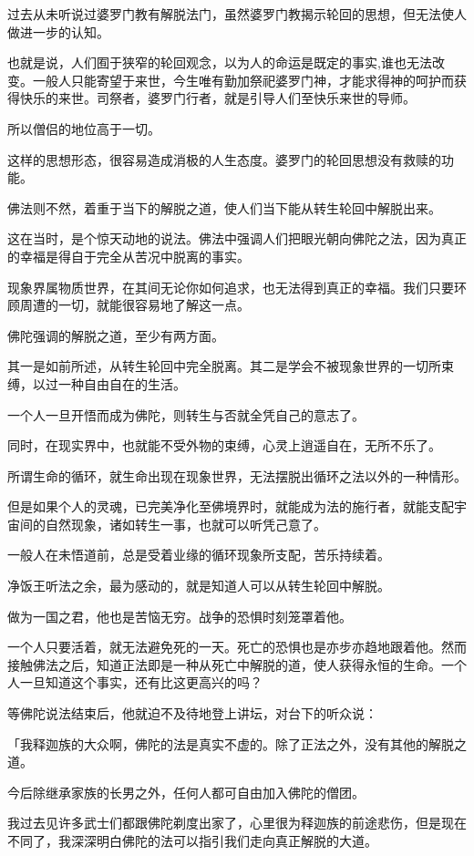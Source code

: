 \documentclass[twoside,openany]{book}
\begin{document}
过去从未听说过婆罗门教有解脱法门，虽然婆罗门教揭示轮回的思想，但无法使人做进一步的认知。

也就是说，人们囿于狭窄的轮回观念，以为人的命运是既定的事实,谁也无法改变。一般人只能寄望于来世，今生唯有勤加祭祀婆罗门神，才能求得神的呵护而获得快乐的来世。司祭者，婆罗门行者，就是引导人们至快乐来世的导师。

所以僧侣的地位高于一切。

这样的思想形态，很容易造成消极的人生态度。婆罗门的轮回思想没有救赎的功能。

佛法则不然，着重于当下的解脱之道，使人们当下能从转生轮回中解脱出来。

这在当时，是个惊天动地的说法。佛法中强调人们把眼光朝向佛陀之法，因为真正的幸福是得自于完全从苦况中脱离的事实。

现象界属物质世界，在其间无论你如何追求，也无法得到真正的幸福。我们只要环顾周遭的一切，就能很容易地了解这一点。

佛陀强调的解脱之道，至少有两方面。

其一是如前所述，从转生轮回中完全脱离。其二是学会不被现象世界的一切所束缚，以过一种自由自在的生活。

一个人一旦开悟而成为佛陀，则转生与否就全凭自己的意志了。

同时，在现实界中，也就能不受外物的束缚，心灵上逍遥自在，无所不乐了。

所谓生命的循环，就生命出现在现象世界，无法摆脱出循环之法以外的一种情形。

但是如果个人的灵魂，已完美净化至佛境界时，就能成为法的施行者，就能支配宇宙间的自然现象，诸如转生一事，也就可以听凭己意了。

一般人在未悟道前，总是受着业缘的循环现象所支配，苦乐持续着。

净饭王听法之余，最为感动的，就是知道人可以从转生轮回中解脱。

做为一国之君，他也是苦恼无穷。战争的恐惧时刻笼罩着他。

一个人只要活着，就无法避免死的一天。死亡的恐惧也是亦步亦趋地跟着他。然而接触佛法之后，知道正法即是一种从死亡中解脱的道，使人获得永恒的生命。一个人一旦知道这个事实，还有比这更高兴的吗？

等佛陀说法结束后，他就迫不及待地登上讲坛，对台下的听众说：

「我释迦族的大众啊，佛陀的法是真实不虚的。除了正法之外，没有其他的解脱之道。

今后除继承家族的长男之外，任何人都可自由加入佛陀的僧团。

我过去见许多武士们都跟佛陀剃度出家了，心里很为释迦族的前途悲伤，但是现在不同了，我深深明白佛陀的法可以指引我们走向真正解脱的大道。
\end{document}
